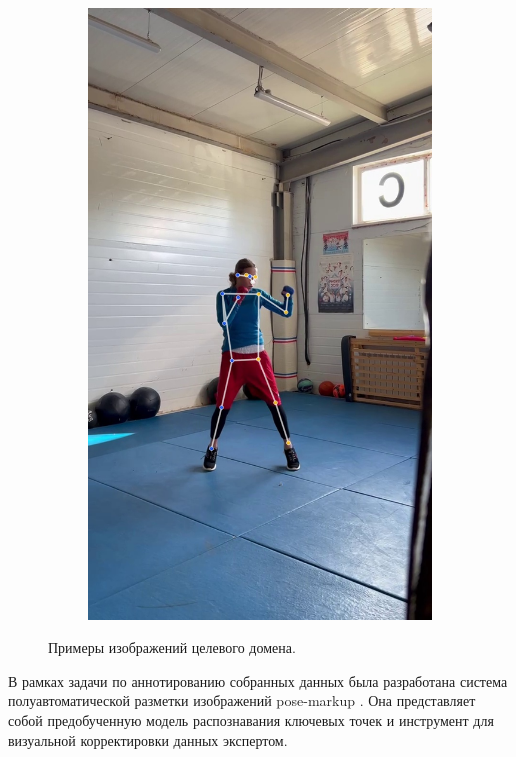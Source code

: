 \begin{figure}[h]
\begin{subfigure}[b]{0.24\textwidth}
	\includegraphics[width=\textwidth]{./images/data_info/box_examples/ex_0}
\end{subfigure}
\caption{Примеры изображений целевого домена.}
\label{fig:target_examples}
\end{figure}

В рамках задачи по аннотированию собранных данных была разработана система полуавтоматической разметки изображений pose-markup \cite{pose_markup}. Она представляет собой предобученную модель распознавания ключевых точек и инструмент для визуальной корректировки данных экспертом.

